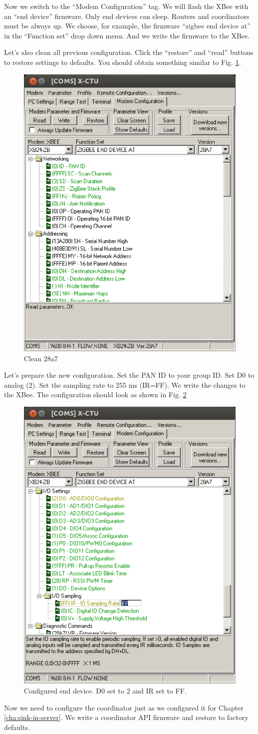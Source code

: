 Now we switch to the ``Modem Configuration'' tag.
We will flash the XBee with an ``end device'' firmware.
Only end devices can sleep.
Routers and coordinators must be always up.
We choose, for example, the firmware ``zigbee end device at'' in the ``Function set'' drop down menu.
And we write the firmware to the XBee.

Let's also clean all previous configuration.
Click the ``restore'' and ``read'' buttons to restore settings to defaults.
You should obtain something similar to Fig. \ref{fig:clean-28a7}.

\begin{figure}[htbp]
  \centering
  \includegraphics[width=0.3\linewidth]{figures/clean-28a7}
  \caption{Clean 28a7}
  \label{fig:clean-28a7}
\end{figure}

Let's prepare the new configuration.
Set the PAN ID to your group ID.
Set D0 to analog (2).
Set the sampling rate to 255 ms (IR=FF).
We write the changes to the XBee.
The configuration should look as shown in Fig. \ref{fig:configured-end-device}

\begin{figure}[htbp]
  \centering
  \includegraphics[width=0.3\linewidth]{figures/configured-end-device}
  \caption{Configured end device. D0 set to 2 and IR set to FF.}
  \label{fig:configured-end-device}
\end{figure}

Now we need to configure the coordinator just as we configured it for 
Chapter \ref{cha:sink-in-server}.
We write a coordinator API firmware and restore to factory defaults.

